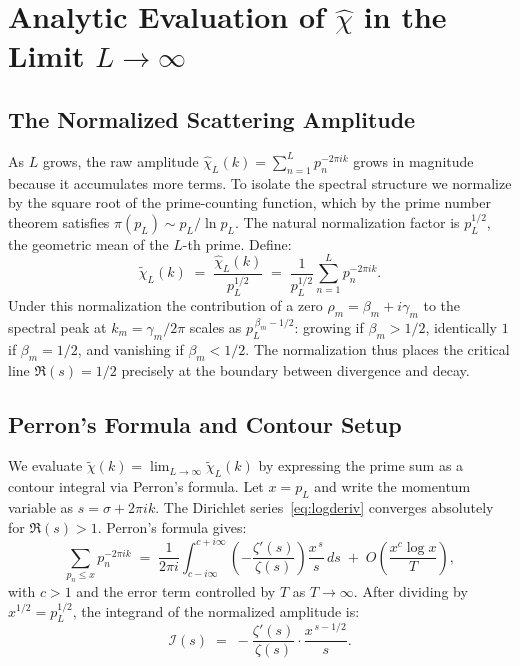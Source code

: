 \documentclass[11pt, oneside]{article}
\theoremstyle{definition}
\begin{document}
\section{Analytic Evaluation of $\hat{\chi}$ in the Limit
         $L \to \infty$}
\label{sec:analytic}

\subsection{The Normalized Scattering Amplitude}

As $L$ grows, the raw amplitude
$\hat{\chi}_L(k) = \sum_{n=1}^{L} p_n^{-2\pi ik}$
grows in magnitude because it accumulates more terms.
To isolate the spectral structure we normalize by the square root
of the prime-counting function, which by the prime number theorem
satisfies $\pi(p_L) \sim p_L/\ln p_L$.
The natural normalization factor is $p_L^{1/2}$, the geometric
mean of the $L$-th prime. Define:
\begin{equation}
  \tilde{\chi}_L(k)
  \;=\; \frac{\hat{\chi}_L(k)}{p_L^{1/2}}
  \;=\; \frac{1}{p_L^{1/2}} \sum_{n=1}^{L} p_n^{-2\pi ik}.
\end{equation}
Under this normalization the contribution of a zero
$\rho_m = \beta_m + i\gamma_m$ to the spectral peak at
$k_m = \gamma_m/2\pi$ scales as $p_L^{\,\beta_m - 1/2}$:
growing if $\beta_m > 1/2$, identically $1$ if $\beta_m = 1/2$,
and vanishing if $\beta_m < 1/2$.
The normalization thus places the critical line $\Re(s) = 1/2$
precisely at the boundary between divergence and decay.

\subsection{Perron's Formula and Contour Setup}

We evaluate
$\tilde{\chi}(k) = \lim_{L\to\infty}\tilde{\chi}_L(k)$
by expressing the prime sum as a contour integral via Perron's
formula. Let $x = p_L$ and write the momentum variable as
$s = \sigma + 2\pi ik$. The Dirichlet
series~\eqref{eq:logderiv} converges absolutely for $\Re(s)>1$.
Perron's formula gives:
\begin{equation}
  \sum_{p_n \leq x} p_n^{-2\pi ik}
  \;=\; \frac{1}{2\pi i}
        \int_{c-i\infty}^{c+i\infty}
        \left(-\frac{\zeta'(s)}{\zeta(s)}\right)
        \frac{x^{\,s}}{s}\,ds
        \;+\; O\!\left(\frac{x^c \log x}{T}\right),
  \label{eq:perron}
\end{equation}
with $c > 1$ and the error term controlled by $T$ as
$T\to\infty$.
After dividing by $x^{1/2} = p_L^{1/2}$, the integrand of the
normalized amplitude is:
\begin{equation}
  \mathcal{I}(s)
  \;=\; -\frac{\zeta'(s)}{\zeta(s)} \cdot \frac{x^{\,s-1/2}}{s}.
  \label{eq:integrand}
\end{equation}
\end{document}
